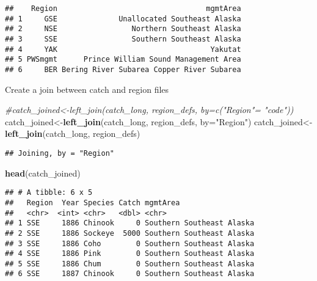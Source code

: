 \documentclass[]{article}
\newenvironment{Shaded}{\begin{snugshade}}{\end{snugshade}}
\newcommand{\CommentTok}[1]{\textcolor[rgb]{0.56,0.35,0.01}{\textit{#1}}}
\newcommand{\DataTypeTok}[1]{\textcolor[rgb]{0.13,0.29,0.53}{#1}}
\newcommand{\KeywordTok}[1]{\textcolor[rgb]{0.13,0.29,0.53}{\textbf{#1}}}
\newcommand{\NormalTok}[1]{#1}
\newcommand{\StringTok}[1]{\textcolor[rgb]{0.31,0.60,0.02}{#1}}
\begin{document}
\begin{verbatim}
##    Region                                  mgmtArea
## 1     GSE              Unallocated Southeast Alaska
## 2     NSE                 Northern Southeast Alaska
## 3     SSE                 Southern Southeast Alaska
## 4     YAK                                   Yakutat
## 5 PWSmgmt      Prince William Sound Management Area
## 6     BER Bering River Subarea Copper River Subarea
\end{verbatim}

Create a join between catch and region files

\begin{Shaded}
\begin{Highlighting}[]
\CommentTok{#catch_joined<-left_join(catch_long, region_defs, by=c("Region"= "code"))}
\NormalTok{catch_joined<-}\KeywordTok{left_join}\NormalTok{(catch_long, region_defs, }\DataTypeTok{by=}\StringTok{"Region"}\NormalTok{)}
\NormalTok{catch_joined<-}\StringTok{ }\KeywordTok{left_join}\NormalTok{(catch_long, region_defs)}
\end{Highlighting}
\end{Shaded}

\begin{verbatim}
## Joining, by = "Region"
\end{verbatim}

\begin{Shaded}
\begin{Highlighting}[]
\KeywordTok{head}\NormalTok{(catch_joined)}
\end{Highlighting}
\end{Shaded}

\begin{verbatim}
## # A tibble: 6 x 5
##   Region  Year Species Catch mgmtArea                 
##   <chr>  <int> <chr>   <dbl> <chr>                    
## 1 SSE     1886 Chinook     0 Southern Southeast Alaska
## 2 SSE     1886 Sockeye  5000 Southern Southeast Alaska
## 3 SSE     1886 Coho        0 Southern Southeast Alaska
## 4 SSE     1886 Pink        0 Southern Southeast Alaska
## 5 SSE     1886 Chum        0 Southern Southeast Alaska
## 6 SSE     1887 Chinook     0 Southern Southeast Alaska
\end{verbatim}
\end{document}
